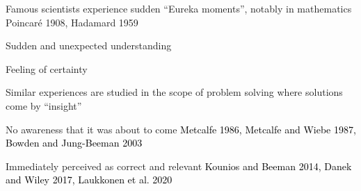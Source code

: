 \documentclass[11pt]{beamer}
\begin{document}
 \begin{frame}

          Famous scientists experience sudden \textcolor{bittersweet}{``Eureka moments''}, notably in mathematics \footnotesize{Poincar\'{e} 1908, Hadamard 1959}

          \normalsize

          \textcolor{bittersweet}{Sudden and unexpected understanding}

          \textcolor{bittersweet}{Feeling of certainty}


            Similar experiences are studied in the scope of problem solving where solutions come by ``insight''

            \textcolor{bittersweet}{No awareness that it was about to come \textcolor{black}{\footnotesize{Metcalfe 1986, Metcalfe and Wiebe 1987, Bowden and Jung-Beeman 2003}}}

            \normalsize

          \textcolor{bittersweet}{Immediately perceived as correct and relevant \textcolor{black}{\footnotesize{Kounios and Beeman 2014, Danek and Wiley 2017, Laukkonen et al. 2020}}}
 





        \end{frame}

         







 
\end{document}
